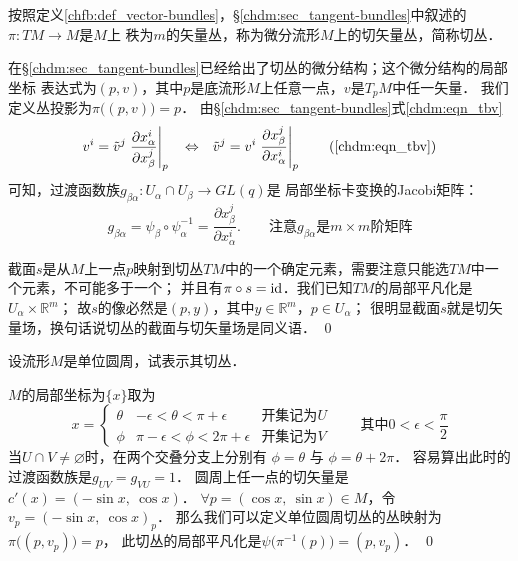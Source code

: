 \begin{example}\label{chfb:exm_tb}
    按照定义\ref{chfb:def_vector-bundles}，\S \ref{chdm:sec_tangent-bundles}中叙述的$\pi:TM\to M$是$M$上
    秩为$m$的矢量丛，称为微分流形$M$上的{\heiti 切矢量丛}，简称{\heiti 切丛}．
\end{example}
在\S \ref{chdm:sec_tangent-bundles}已经给出了切丛的微分结构；这个微分结构的局部坐标
表达式为$(p,v)$，其中$p$是底流形$M$上任意一点，$v$是$T_pM$中任一矢量．
我们定义丛投影为$\pi\bigl( (p,v)\bigr)=p$．
由\S \ref{chdm:sec_tangent-bundles}式\eqref{chdm:eqn_tbv}
\begin{equation}
    v^i = \tilde{v}^j \left. \frac{\partial {x}^i_\alpha}{\partial {x}^j_\beta}  \right | _p
    {\quad \Leftrightarrow \quad}
    \tilde{v}^j = {v}^i \left. \frac{\partial {x}^j_\beta}{\partial {x}^i_\alpha}  \right | _p 
    \tag{\ref{chdm:eqn_tbv}}
\end{equation}
可知，过渡函数族$g_{\beta\alpha}: U_\alpha \cap U_\beta \to GL(q)$是
局部坐标卡变换的Jacobi矩阵：
\begin{equation}
    g_{\beta\alpha} = \psi_\beta \circ \psi^{-1}_{\alpha}
    = \frac{\partial {x}^j_\beta}{\partial {x}^i_\alpha}  .
    \qquad \text{注意}g_{\beta\alpha}\text{是} m\times m \text{阶矩阵}
\end{equation}

截面$s$是从$M$上一点$p$映射到切丛$TM$中的一个确定元素，需要注意只能选$TM$中一个元素，不可能多于一个；
并且有$\pi \circ s = {\rm id}$．我们已知$TM$的局部平凡化是$U_\alpha \times \mathbb{R}^m$；
故$s$的像必然是$(p,y)$，其中$y\in \mathbb{R}^m$，$p\in U_\alpha$；
很明显截面$s$就是{\kaishu 切矢量场}，换句话说切丛的截面与切矢量场是同义语．
\qed

\begin{example}
    设流形$M$是单位圆周，试表示其切丛．
\end{example}
$M$的局部坐标为$\{x\}$取为
\begin{equation*}
    x=\left\{\begin{array}{ccc}
        \theta& -\epsilon <\theta<\pi+\epsilon & \text{开集记为}U \\
        \phi & \pi -\epsilon <\phi <2\pi +\epsilon  & \text{开集记为}V
    \end{array} \right.
    \qquad \text{其中} 0<\epsilon<\frac{\pi}{2}
\end{equation*}
当$U\cap V\neq \varnothing$时，在两个交叠分支上分别有 $\phi=\theta$ 与 $\phi=\theta+2\pi$．
容易算出此时的过渡函数族是$g_{UV}=g_{VU}=1$．
圆周上任一点的切矢量是$c'(x)=(-\sin x,\ \cos x)$．
$\forall p=(\cos x,\ \sin x)\in M$，令$v_p=(-\sin x,\ \cos x)_p$．
那么我们可以定义单位圆周切丛的丛映射为$\pi \bigl( (p,v_p) \bigr)=p$，
此切丛的局部平凡化是$\psi\bigl(\pi^{-1}(p) \bigr)=(p,v_p)$．
\qed




